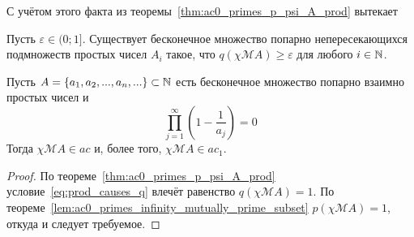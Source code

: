 С учётом этого факта
из теоремы~\ref{thm:ac0_primes_p_psi_A_prod} вытекает
\begin{lemma}
	\label{lem:q_x_infinite_Euler}
	Пусть $\varepsilon \in  (0; 1{]}$.
	Существует бесконечное множество попарно непересекающихся подмножеств простых чисел
	$A_i$ такое, что $q(\chi\mathscr{M}A)\geq\varepsilon$ для любого $i\in\mathbb{N}$.
\end{lemma}



\begin{theorem}
	Пусть $A=\{a_1, a_2, ..., a_n, ...\}\subset\mathbb{N}$ есть бесконечное множество попарно взаимно простых чисел
	и
	\begin{equation}
		\label{eq:prod_causes_q}
		\prod_{j=1}^\infty \left(1-\frac{1}{a_j}\right) = 0
	\end{equation}
	Тогда $\chi\mathscr{M}A\in ac$ и, более того, $\chi\mathscr{M}A\in ac_1$.
\end{theorem}

\begin{proof}
	По теореме~\ref{thm:ac0_primes_p_psi_A_prod} условие~\eqref{eq:prod_causes_q} влечёт равенство $q(\chi\mathscr{M}A)=1$.
	По теореме~\ref{lem:ac0_primes_infinity_mutually_prime_subset} $p(\chi\mathscr{M}A)=1$,
	откуда и следует требуемое.
\end{proof}

